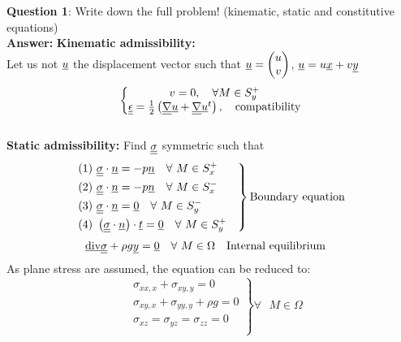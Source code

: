 \noindent \textbf{Question 1}: Write down the full problem! (kinematic, static and constitutive equations) \\

\textbf{Answer:} 
\textbf{Kinematic admissibility:}\\
Let us not $\underline{u}$ the displacement vector such that $\underline{u}=\left(\begin{matrix}
u \\ v
\end{matrix} \right) $, $\underline{u}=u\underline{x}+v \underline{y}$\\
\begin{equation}
\left\lbrace \begin{matrix}
v=0, \quad \forall M \in S_y^+ \\
\underline{\underline{\epsilon}}=\frac{1}{2}\left( \underline{\underline{\nabla}}\underline{u} + \underline{\underline{\nabla}}\underline{u}^t\right), \quad \text{compatibility}
\end{matrix}\right.
\end{equation}
\\
\textbf{Static admissibility:}
Find $\underline{\underline{\sigma}} $ symmetric such that
\begin{equation}
\left. \begin{split}
& \text{(1)  } \underline{\underline{\sigma}} \cdot \underline{n} = -p\underline{n} \quad \forall \text{ } M \in S_x^+ \quad \\
& \text{(2)  } \underline{\underline{\sigma}} \cdot \underline{n} = -p\underline{n} \quad \forall \text{ } M \in S_x^- \quad \\
& \text{(3)  } \underline{\underline{\sigma}} \cdot \underline{n} = \underline{0} \quad \forall \text{ } M \in S_y^- \quad \\
& \text{(4)  } \left( \underline{\underline{\sigma}} \cdot \underline{n}\right) \cdot \underline{t} = \underline{0} \quad \forall \text{ } M \in S_y^+ \quad \\
\end{split} \right\rbrace \text{Boundary equation}
\end{equation}
\begin{equation}
\begin{split}
&  \text{\underline{div}} \underline{\underline{\sigma}} + \rho g\underline{y}= \underline{0} \quad \forall \text{ } M \in \Omega \quad \text{Internal equilibrium}
\end{split}
\end{equation}
As plane stress are assumed, the equation can be reduced to:
\begin{equation}
\left. \begin{split}
&  \sigma_{xx,x} + \sigma_{xy,y} = 0\\
&  \sigma_{xy,x} + \sigma_{yy,y} + \rho g = 0\\
&  \sigma_{xz} = \sigma_{yz} = \sigma_{zz} = 0\\
\end{split}\right\rbrace \forall \text{ } M \in \Omega
\end{equation}
